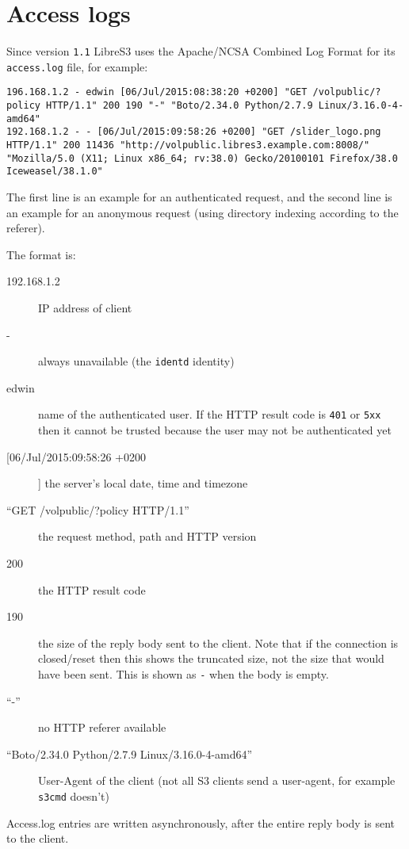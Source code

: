 \section{Access logs}

Since version \verb|1.1| LibreS3 uses the Apache/NCSA Combined Log Format for
its \verb|access.log| file, for example:
\begin{lstlisting}
196.168.1.2 - edwin [06/Jul/2015:08:38:20 +0200] "GET /volpublic/?policy HTTP/1.1" 200 190 "-" "Boto/2.34.0 Python/2.7.9 Linux/3.16.0-4-amd64"
192.168.1.2 - - [06/Jul/2015:09:58:26 +0200] "GET /slider_logo.png HTTP/1.1" 200 11436 "http://volpublic.libres3.example.com:8008/" "Mozilla/5.0 (X11; Linux x86_64; rv:38.0) Gecko/20100101 Firefox/38.0 Iceweasel/38.1.0"
\end{lstlisting}

The first line is an example for an authenticated request, and the second line
is an example for an anonymous request (using directory indexing according to
the referer).

The format is:
\begin{description}
\item[192.168.1.2] IP address of client
\item[-] always unavailable (the \verb|identd| identity)
\item[edwin] name of the authenticated \SX user. If the HTTP result code is
  \verb|401| or \verb|5xx| then it cannot be trusted because the user may not be
  authenticated yet
\item[[06/Jul/2015:09:58:26 +0200]] the server's local date, time and
  timezone
\item[``GET /volpublic/?policy HTTP/1.1''] the request method, path and
  HTTP version
\item[200] the HTTP result code
\item[190] the size of the reply body sent to the client. Note that if the
  connection is closed/reset then this shows the truncated size, not the size
  that would have been sent. This is shown as \verb|-| when the body is empty.
\item[``-''] no HTTP referer available
\item[``Boto/2.34.0 Python/2.7.9 Linux/3.16.0-4-amd64'']

 User-Agent of the client (not all S3 clients send a user-agent, for example \verb|s3cmd| doesn't)
\end{description}

Access.log entries are written asynchronously, after the entire reply body is
sent to the client.

